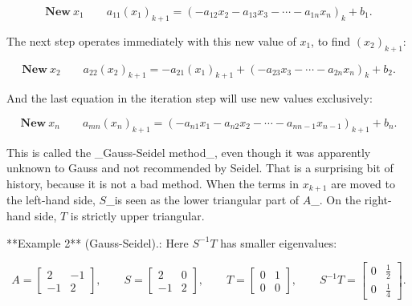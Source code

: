 \[\textbf{New}\ x_{1}\qquad a_{11}(x_{1})_{k+1}=(-a_{12}x_{2}-a_{13}x_{3}-\cdots -a_{1n}x_{n})_{k}+b_{1}.\]

The next step operates immediately with this new value of \(x_{1}\), to find \((x_{2})_{k+1}\):

\[\textbf{New}\ x_{2}\qquad a_{22}(x_{2})_{k+1}=-a_{21}(x_{1})_{k+1}+(-a_{23}x_{ 3}-\cdots-a_{2n}x_{n})_{k}+b_{2}.\]

And the last equation in the iteration step will use new values exclusively:

\[\textbf{New}\ x_{n}\qquad a_{mn}(x_{n})_{k+1}=(-a_{n1}x_{1}-a_{n2}x_{2}-\cdots -a_{nn-1}x_{n-1})_{k+1}+b_{n}.\]

This is called the _Gauss-Seidel method_, even though it was apparently unknown to Gauss and not recommended by Seidel. That is a surprising bit of history, because it is not a bad method. When the terms in \(x_{k+1}\) are moved to the left-hand side, \(S\)_is seen as the lower triangular part of \(A\)_. On the right-hand side, \(T\) is strictly upper triangular.

**Example 2** (Gauss-Seidel).: Here \(S^{-1}T\) has smaller eigenvalues:

\[A=\begin{bmatrix}2&-1\\ -1&2\end{bmatrix},\qquad S=\begin{bmatrix}2&0\\ -1&2\end{bmatrix},\qquad T=\begin{bmatrix}0&1\\ 0&0\end{bmatrix},\qquad S^{-1}T=\begin{bmatrix}0&\frac{1}{2}\\ 0&\frac{1}{4}\end{bmatrix}.\] 